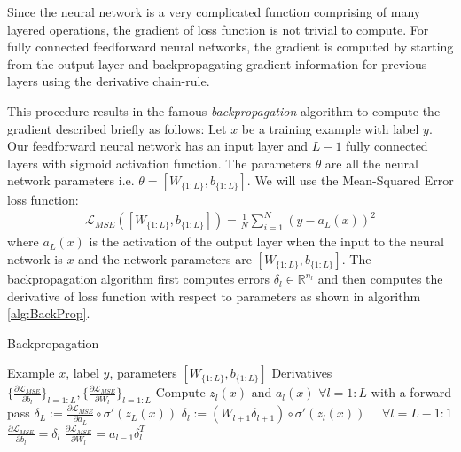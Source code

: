 Since the neural network is a very complicated function comprising of many layered operations, the gradient of loss function is not trivial to compute.
For fully connected feedforward neural networks, the gradient is computed by starting from the output layer and backpropagating gradient information for previous layers using the derivative chain-rule.

This procedure results in the famous \textit{backpropagation} algorithm to compute the gradient described briefly as follows:
Let $x$ be a training example with label $y$. Our feedforward neural network has an input layer and $L-1$ fully connected layers with sigmoid activation function. The parameters $\theta$ are all the neural network parameters i.e. $\theta = [W_{\{1:L\}}, b_{\{1:L\}}]$. We will use the Mean-Squared Error loss function:
\begin{align}
\mathcal{L}_{MSE} ([W_{\{1:L\}}, b_{\{1:L\}}]) = \frac{1}{N} \sum_{i=1}^N ( y - a_L(x))^2
\end{align}
where $a_L(x)$ is the activation of the output layer when the input to the neural network is $x$ and the network parameters are $[W_{\{1:L\}}, b_{\{1:L\}}]$.
The backpropagation algorithm first computes errors $\delta_l \in \mathbb{R}^{n_l}$ and then computes the derivative of loss function with respect to parameters as shown in algorithm \ref{alg:BackProp}.
\begin{algorithm}[tb]
   \caption{Backpropagation}
   \label{alg:BackProp}
\begin{algorithmic}
    Example $x$, label $y$, parameters $[W_{\{1:L\}}, b_{\{1:L\}}]$
    Derivatives $\{\frac{\partial \mathcal{L}_{MSE}}{\partial b_l}\}_{l=1:L}, \{\frac{\partial \mathcal{L}_{MSE}}{\partial W_l}\}_{l=1:L}$
   \STATE
   \STATE Compute $z_l(x) \text{ and } a_l(x) \hspace{4pt} \forall l=1:L$ with a forward pass
   \STATE $\delta_L := \frac{\partial \mathcal{L}_{MSE}}{\partial a_L} \circ \sigma'(z_L(x))$
   \STATE $\delta_l := (W_{l+1} \delta_{l+1}) \circ \sigma'(z_l(x)) \hspace{16pt} \forall l=L-1:1$
   \STATE $\frac{\partial \mathcal{L}_{MSE}}{\partial b_l} = \delta_l$
   \STATE $\frac{\partial \mathcal{L}_{MSE}}{\partial W_l} = a_{l-1} \delta_l^T$
   \ENDFOR
\end{algorithmic}
\end{algorithm}